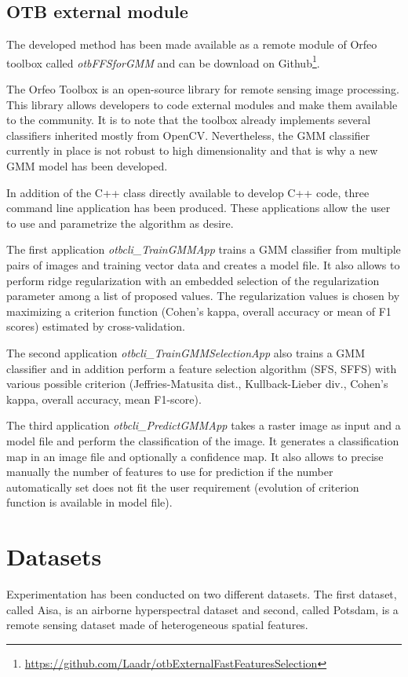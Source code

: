 \documentclass[journal,peerreview,onecolumn]{IEEEtran}
\begin{document}
    \subsection{OTB external module}
    \label{sec:otb-module}

    The developed method has been made available as a remote module of Orfeo toolbox called \emph{otbFFSforGMM} and can be download on Github\footnote{\url{https://github.com/Laadr/otbExternalFastFeaturesSelection}}.

    The Orfeo Toolbox is an open-source library for remote sensing image processing. This library allows developers to code external modules and make them available to the community. It is to note that the toolbox already implements several classifiers inherited mostly from OpenCV. Nevertheless, the GMM classifier currently in place is not robust to high dimensionality and that is why a new GMM model has been developed.

    In addition of the C++ class directly available to develop C++ code, three command line application has been produced. These applications allow the user to use and parametrize the algorithm as desire.

    The first application \emph{otbcli\_TrainGMMApp} trains a GMM classifier from multiple pairs of images and training vector data and creates a model file. It also allows to perform ridge regularization with an embedded selection of the regularization parameter among a list of proposed values. The regularization values is chosen by maximizing a criterion function (Cohen's kappa, overall accuracy or mean of F1 scores) estimated by cross-validation.

    The second application \emph{otbcli\_TrainGMMSelectionApp} also trains a GMM classifier and in addition perform a feature selection algorithm (SFS, SFFS) with various possible criterion (Jeffries-Matusita dist., Kullback-Lieber div., Cohen’s kappa, overall accuracy, mean F1-score).

    The third application \emph{otbcli\_PredictGMMApp} takes a raster image as input and a model file and perform the classification of the image. It generates a classification map in an image file and optionally a confidence map. It also allows to precise manually the number of features to use for prediction if the number automatically set does not fit the user requirement (evolution of criterion function is available in model file).

\section{Datasets}
\label{sec:datasets}
Experimentation has been conducted on two different datasets. The first dataset, called Aisa, is an airborne hyperspectral dataset and second, called Potsdam, is a remote sensing dataset made of heterogeneous spatial features.
\end{document}
